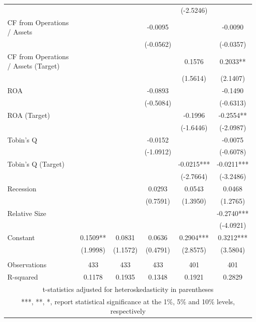 \documentclass[12pt]{article}
\begin{document}
\begin{appendices}
\begin{table}[!htbp]
\begin{adjustbox}{max width=\textwidth}
\begin{tabular}{lccccc}
			&  &  &  & (-2.5246) &  \\
		   CF from Operations / Assets &  &  & -0.0095 &  & -0.0090 \\
			&  &  & (-0.0562) &  & (-0.0357) \\
		   CF from Operations / Assets (Target) &  &  &  & 0.1576 & 0.2033** \\
			&  &  &  & (1.5614) & (2.1407) \\
		   ROA &  &  & -0.0893 &  & -0.1490 \\
			&  &  & (-0.5084) &  & (-0.6313) \\
		   ROA (Target) &  &  &  & -0.1996 & -0.2554** \\
			&  &  &  & (-1.6446) & (-2.0987) \\
		   Tobin's Q &  &  & -0.0152 &  & -0.0075 \\
			&  &  & (-1.0912) &  & (-0.6078) \\
		   Tobin's Q (Target) &  &  &  & -0.0215*** & -0.0211*** \\
			&  &  &  & (-2.7664) & (-3.2486) \\
		   Recession &  &  & 0.0293 & 0.0543 & 0.0468 \\
			&  &  & (0.7591) & (1.3950) & (1.2765) \\
		   Relative Size &  &  &  &  & -0.2740*** \\
			&  &  &  &  & (-4.0921) \\
		   Constant & 0.1509** & 0.0831 & 0.0636 & 0.2904*** & 0.3212*** \\
			& (1.9998) & (1.1572) & (0.4791) & (2.8575) & (3.5804) \\
			&  &  &  &  &  \\
		   Observations & 433 & 433 & 433 & 401 & 401 \\
			R-squared & 0.1178 & 0.1935 & 0.1348 & 0.1921 & 0.2829 \\ \hline
			\multicolumn{6}{c}{ t-statistics adjusted for heteroskedasticity in parentheses} \\
			\multicolumn{6}{c}{ ***, **, *, report statistical significance at the 1\%, 5\% and 10\% levels, respectively}\\
		   \end{tabular}			   
	\end{adjustbox}
\end{table}


\end{appendices}
\end{document}
